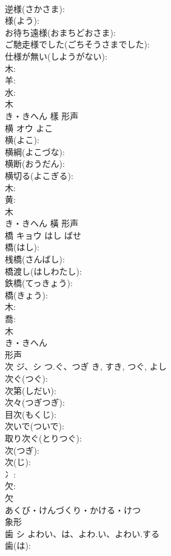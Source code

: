\documentclass[8pt]{extreport}
\begin{document}
\begin{CJK}{UTF8}{min}
\\	逆様(さかさま): 
\\	様(よう): 
\\	お待ち遠様(おまちどおさま): 
\\	ご馳走様でした(ごちそうさまでした): 
\\	仕様が無い(しようがない): 
\\	木: 
\\	羊: 
\\	水: 
\\	木	
\\	き・きへん	樣	形声 
\\	横	オウ	よこ		
\\	横(よこ): 
\\	横綱(よこづな): 
\\	横断(おうだん): 
\\	横切る(よこぎる): 
\\	木: 
\\	黄: 
\\	木	
\\	き・きへん	橫	形声 
\\	橋	キョウ	はし	ばせ	
\\	橋(はし): 
\\	桟橋(さんばし): 
\\	橋渡し(はしわたし): 
\\	鉄橋(てっきょう): 
\\	橋(きょう): 
\\	木: 
\\	喬: 
\\	木	
\\	き・きへん	
\\	形声 
\\	次	ジ、シ	つ.ぐ、つぎ	き, すき, つぐ, よし	
\\	次ぐ(つぐ): 
\\	次第(しだい): 
\\	次々(つぎつぎ): 
\\	目次(もくじ): 
\\	次いで(ついで): 
\\	取り次ぐ(とりつぐ): 
\\	次(つぎ): 
\\	次(じ): 
\\	冫: 
\\	欠: 
\\	欠	
\\	あくび・けんづくり・かける・けつ	
\\	象形 
\\	歯	シ	よわい、は、よわ.い、よわい.する		
\\	歯(は): 

\end{CJK}
\end{document}
